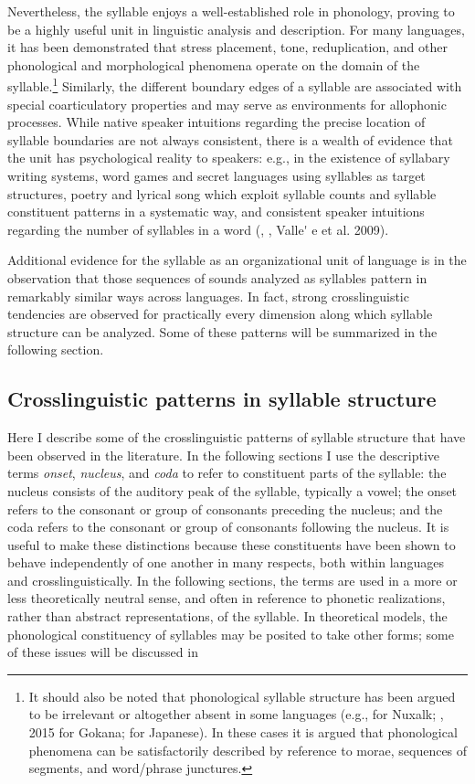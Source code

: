   Nevertheless, the syllable enjoys a well-established role in phonology, proving to be a highly useful unit in linguistic analysis and description. For many languages, it has been demonstrated that stress placement, tone, reduplication, and other phonological and morphological phenomena operate on the domain of the syllable.\footnote{ \textrm{It should also be noted that phonological syllable structure has been argued to be irrelevant or altogether absent in some languages (e.g., \citealt{Newman1947} for Nuxalk; \citealt{Hyman2011}, 2015 for Gokana; \citealt{Labrune2012} for Japanese). In these cases it is argued that phonological phenomena can be satisfactorily described by reference to morae, sequences of segments, and word/phrase junctures.}} Similarly, the different boundary edges of a syllable are associated with special coarticulatory properties and may serve as environments for allophonic processes. While native speaker intuitions regarding the precise location of syllable boundaries are not always consistent, there is a wealth of evidence that the unit has psychological reality to speakers: e.g., in the existence of syllabary writing systems, word games and secret languages using syllables as target structures, poetry and lyrical song which exploit syllable counts and syllable constituent patterns in a systematic way, and consistent speaker intuitions regarding the number of syllables in a word (\citealt{BellHooper1978}, \citealt{Blevins1995}, Valle\'{} e et al. 2009).

  Additional evidence for the syllable as an organizational unit of language is in the observation that those sequences of sounds analyzed as syllables pattern in remarkably similar ways across languages. In fact, strong crosslinguistic tendencies are observed for practically every dimension along which syllable structure can be analyzed. Some of these patterns will be summarized in the following section.

\subsection{Crosslinguistic patterns in syllable structure}\label{sec:1.1.2}

  Here I describe some of the crosslinguistic patterns of syllable structure that have been observed in the literature. In the following sections I use the descriptive terms \textit{onset}, \textit{nucleus}, and \textit{coda} to refer to constituent parts of the syllable: the nucleus consists of the auditory peak of the syllable, typically a vowel; the onset refers to the consonant or group of consonants preceding the nucleus; and the coda refers to the consonant or group of consonants following the nucleus. It is useful to make these distinctions because these constituents have been shown to behave independently of one another in many respects, both within languages and crosslinguistically. In the following sections, the terms are used in a more or less theoretically neutral sense, and often in reference to phonetic realizations, rather than abstract representations, of the syllable. In theoretical models, the phonological constituency of syllables may be posited to take other forms; some of these issues will be discussed in 

